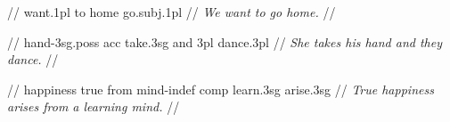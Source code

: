 \documentclass{article}
\begin{document}
\ex
\begingl
\gla {}     //
 want.{\sc 1pl} to home go.{\sc subj.1pl} //
\glft \textit{We want to go home.} //
\endgl
\xe

\ex
\begingl
\gla {}       //
 hand-{\sc 3sg.poss} {\sc acc} take.{\sc 3sg} and {\sc 3pl} dance.{\sc 3pl} //
\glft \textit{She takes his hand and they dance.} //
\endgl
\xe

\ex
\begingl
\gla {}       //
\glb happiness true from mind-{\sc indef} {\sc comp} learn.{\sc 3sg} arise.{\sc 3sg} //
\glft \textit{True happiness arises from a learning mind.} //
\endgl
\xe
\end{document}
